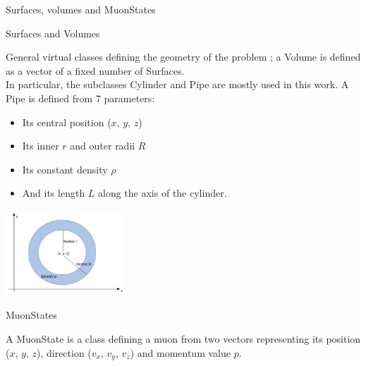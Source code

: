\documentclass[8 pt]{beamer}
\begin{document}
\begin{frame}{Surfaces, volumes and MuonStates}
\justifying
\begin{minipage}[c]{.65\textwidth}
\begin{exampleblock}{} Surfaces and Volumes \end{exampleblock}
\justifying
General virtual classes defining the geometry of the problem ; a Volume is defined as a vector of a fixed number of Surfaces. \\ \vspace{5pt}
In particular, the subclasses Cylinder and Pipe are mostly used in this work. A Pipe is defined from 7 parameters: 
\begin{itemize}
\item Its central position ($x$, $y$, $z$)
\item Its inner $r$ and outer radii $R$
\item Its constant density $\rho$
\item And its length $L$ along the axis of the cylinder.
\end{itemize}
\end{minipage}
\begin{minipage}[c]{.33\textwidth}
\vspace{35pt}
\includegraphics[width=4.5cm, height=3.2cm]{figs/cylinder.png}
\end{minipage} \vfill
\begin{exampleblock}{} MuonStates \end{exampleblock}
A MuonState is a class defining a muon from two vectors representing its position ($x$, $y$, $z$), direction ($v_x$, $v_y$, $v_z$) and momentum value $p$. \\ \vspace{10pt}

\end{frame}
\end{document}
